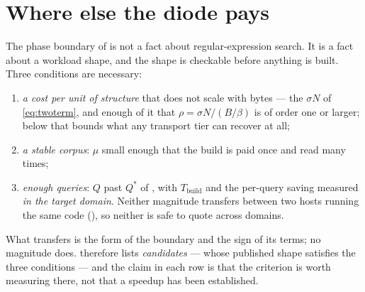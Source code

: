 \documentclass[11pt,letterpaper]{article}
\begin{document}
\section{Where else the diode pays}
\label{sec:uses}
The phase boundary of  is not a fact about
regular-expression search. It is a fact about a workload shape, and the
shape is checkable before anything is built. Three conditions are
necessary:
\begin{enumerate}[leftmargin=*,itemsep=1pt]
\item \emph{a cost per unit of structure} that does not scale with bytes ---
  the $\sigma N$ of \eqref{eq:twoterm}, and enough of it that
  $\rho=\sigma N/(B/\beta)$ is of order one or larger; below that
   bounds what any transport tier can recover at all;
\item \emph{a stable corpus}: $\mu$ small enough that the build is paid
  once and read many times;
\item \emph{enough queries}: $Q$ past $Q^{*}$ of , with
  $T_{\text{build}}$ and the per-query saving measured \emph{in the target
  domain}. Neither magnitude transfers between two hosts running the same
  code (), so neither is safe to quote across domains.
\end{enumerate}
What transfers is the form of the boundary and the sign of its terms; no
magnitude does.  therefore lists \emph{candidates} --- whose
published shape satisfies the three conditions --- and the claim in each row
is that the criterion is worth measuring there, not that a speedup has been
established.
\end{document}
